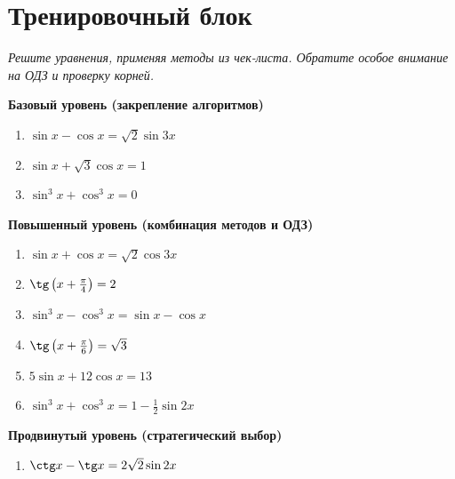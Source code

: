 \documentclass[a4paper,12pt]{article}
\begin{document}
\newpage
\section*{Тренировочный блок}

\textit{Решите уравнения, применяя методы из чек-листа. Обратите особое внимание на ОДЗ и проверку корней.}

\vspace{0.5cm}

\textbf{Базовый уровень (закрепление алгоритмов)}
\begin{enumerate}[leftmargin=*, itemsep=8pt]
    \item $\sin x - \cos x = \sqrt{2}\sin 3x$
    \item $\sin x + \sqrt{3}\cos x = 1$
    \item $\sin^3 x + \cos^3 x = 0$
\end{enumerate}

\vspace{0.5cm}

\textbf{Повышенный уровень (комбинация методов и ОДЗ)}
\begin{enumerate}[leftmargin=*, itemsep=8pt, start=4]
    \item $\sin x + \cos x = \sqrt{2}\cos 3x$
    \item $\tg\left(x + \frac{\pi}{4}\right) = 2$
    \item $\sin^3 x - \cos^3 x = \sin x - \cos x$
    \item $\tg\left(x + \frac{\pi}{6}\right) = \sqrt{3}$
    \item $5\sin x + 12\cos x = 13$
    \item $\sin^3 x + \cos^3 x = 1 - \frac{1}{2}\sin 2x$
\end{enumerate}

\vspace{0.5cm}

\textbf{Продвинутый уровень (стратегический выбор)}
\begin{enumerate}[leftmargin=*, itemsep=8pt, start=10]
    \item $\ctg x - \tg x = 2\sqrt{2}\sin 2x$
\end{enumerate}

\newpage
\end{document}
